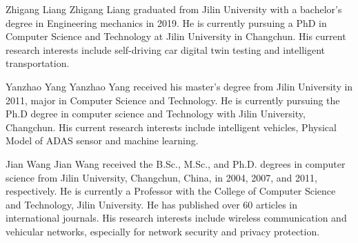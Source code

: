 \documentclass[journal]{IEEEtran}
\begin{document}
	
	
	\begin{IEEEbiography}{Zhigang Liang}
		Zhigang Liang graduated from Jilin University with a bachelor's degree in Engineering mechanics in 2019. He is currently pursuing a PhD in Computer Science and Technology at Jilin University in Changchun. His current research interests include self-driving car digital twin testing and intelligent transportation.\end{IEEEbiography}
	
	\begin{IEEEbiography}{Yanzhao Yang}
		Yanzhao Yang received his master's degree from Jilin University in 2011, major in Computer Science and Technology. He is currently pursuing the Ph.D degree in computer science and Technology with Jilin University, Changchun. His current research interests include intelligent vehicles, Physical Model of ADAS sensor and machine learning.\end{IEEEbiography}
	
	
	\begin{IEEEbiography}{Jian Wang}
		Jian Wang received the B.Sc., M.Sc., and Ph.D.
		degrees in computer science from Jilin University,
		Changchun, China, in 2004, 2007, and 2011, respectively.
		He is currently a Professor with the College of
		Computer Science and Technology, Jilin University.
		He has published over 60 articles in international
		journals. His research interests include wireless communication
		and vehicular networks, especially for
		network security and privacy protection.\end{IEEEbiography}
	
	
	
	
	
	
\end{document}
